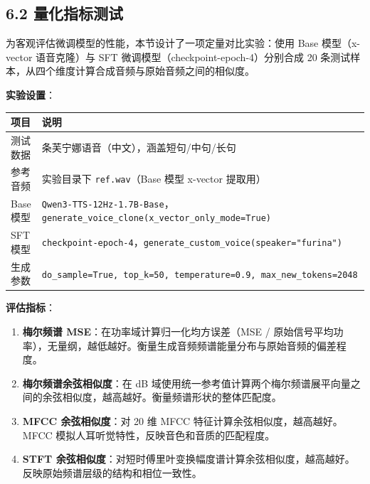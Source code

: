 \documentclass[
  english,
  letterpaper,
  DIV=11,
  numbers=noendperiod]{scrartcl}
\newcounter{none} %
\providecommand{\tightlist}{%
  \setlength{\itemsep}{0pt}\setlength{\parskip}{0pt}}
\begin{document}
\subsection{6.2
量化指标测试}\label{ux91cfux5316ux6307ux6807ux6d4bux8bd5}

为客观评估微调模型的性能，本节设计了一项定量对比实验：使用 Base
模型（x-vector 语音克隆）与 SFT 微调模型（checkpoint-epoch-4）分别合成
20 条测试样本，从四个维度计算合成音频与原始音频之间的相似度。

\textbf{实验设置}：

{\def\LTcaptype{none} %
\begin{longtable}[]{@{}
  >{\raggedright\arraybackslash}p{}
  >{\raggedright\arraybackslash}p{}@{}}
\toprule\noalign{}
\begin{minipage}[b]{\linewidth}\raggedright
项目
\end{minipage} & \begin{minipage}[b]{\linewidth}\raggedright
说明
\end{minipage} \\
\midrule\noalign{}
\endhead
\bottomrule\noalign{}
\endlastfoot
测试数据 & 20 条芙宁娜语音（中文），涵盖短句/中句/长句 \\
参考音频 & 实验目录下 \texttt{ref.wav}（Base 模型 x-vector 提取用） \\
Base 模型 &
\texttt{Qwen3-TTS-12Hz-1.7B-Base}，\texttt{generate\_voice\_clone(x\_vector\_only\_mode=True)} \\
SFT 模型 &
\texttt{checkpoint-epoch-4}，\texttt{generate\_custom\_voice(speaker="furina")} \\
生成参数 &
\texttt{do\_sample=True,\ top\_k=50,\ temperature=0.9,\ max\_new\_tokens=2048} \\
\end{longtable}
}

\textbf{评估指标}：

\begin{enumerate}
\def\labelenumi{\arabic{enumi}.}
\tightlist
\item
  \textbf{梅尔频谱 MSE}：在功率域计算归一化均方误差（MSE /
  原始信号平均功率），无量纲，越低越好。衡量生成音频频谱能量分布与原始音频的偏差程度。
\item
  \textbf{梅尔频谱余弦相似度}：在 dB
  域使用统一参考值计算两个梅尔频谱展平向量之间的余弦相似度，越高越好。衡量频谱形状的整体匹配度。
\item
  \textbf{MFCC 余弦相似度}：对 20 维 MFCC
  特征计算余弦相似度，越高越好。MFCC
  模拟人耳听觉特性，反映音色和音质的匹配程度。
\item
  \textbf{STFT
  余弦相似度}：对短时傅里叶变换幅度谱计算余弦相似度，越高越好。反映原始频谱层级的结构和相位一致性。
\end{enumerate}
\end{document}
